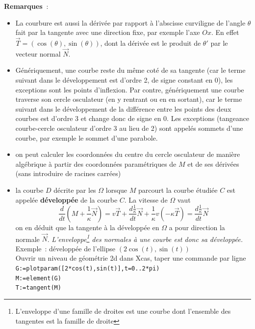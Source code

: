 \documentclass[a4paper,11pt]{article}
\begin{document}
{\bf Remarques~}: 
\begin{itemize}
\item La courbure est aussi la d\'eriv\'ee par
rapport \`a l'abscisse curviligne de 
l'angle $\theta$ fait par la
  tangente avec une direction fixe, par exemple l'axe $Ox$.
En effet $\overrightarrow{T}=(\cos(\theta),\sin(\theta))$,
dont la d\'eriv\'ee est le produit de $\theta'$ par le vecteur
normal $\overrightarrow{N}$.
\item G\'en\'eriquement, une courbe reste du m\^eme cot\'e de
sa tangente (car le terme suivant dans le d\'eveloppement est d'ordre
2, de signe constant en 0), les exceptions sont les points
d'inflexion. Par contre,
g\'en\'eriquement une courbe traverse son cercle osculateur (en y
rentrant ou en en sortant), car le terme suivant dans le
d\'eveloppement de la diff\'erence entre les points des deux courbes 
est d'ordre 3 et change donc de signe en 0. Les exceptions
(tangeance courbe-cercle osculateur d'ordre 3 au lieu de 2)
sont appel\'es sommets d'une courbe, par exemple le sommet d'une
parabole.
\item on peut calculer les coordonn\'ees du centre du cercle
osculateur de mani\`ere alg\'ebrique \`a partir des
coordonn\'ees param\'etriques de $M$ et de ses d\'eriv\'ees
(sans introduire de racines carr\'ees)
\item la courbe $D$ d\'ecrite par les $\Omega$ lorsque $M$ parcourt
la courbe \'etudi\'ee $C$ est appel\'ee
{\bf d\'evelopp\'ee} 
de la courbe $C$. 
La vitesse de $\Omega$ vaut
$$ \frac{d}{dt}(M+\frac1\kappa \overrightarrow{N})=v\overrightarrow{T} +
\frac{d\frac1\kappa}{dt} \overrightarrow{N} + \frac1\kappa v(-\kappa
\overrightarrow{T})
= \frac{d\frac1\kappa}{dt} \overrightarrow{N} $$
on en d\'eduit que la tangente \`a la d\'evelopp\'ee en $\Omega$ a
pour direction la normale $\overrightarrow{N}$. 
{\em L'enveloppe\footnote{L'enveloppe d'une famille
de droites est une courbe dont l'ensemble des tangentes est la famille de droite} 
des normales \`a une courbe est donc sa d\'evelopp\'ee.}\\
Exemple~: d\'evelopp\'ee de l'ellipse $(2\cos(t),\sin(t))$\\
Ouvrir un niveau de g\'eom\'etrie 2d dans Xcas, taper une commande
par ligne\\
\verb|G:=plotparam([2*cos(t),sin(t)],t=0..2*pi)|\\
\verb|M:=element(G)|\\
\verb|T:=tangent(M)|\\

\end{itemize}
\end{document}
